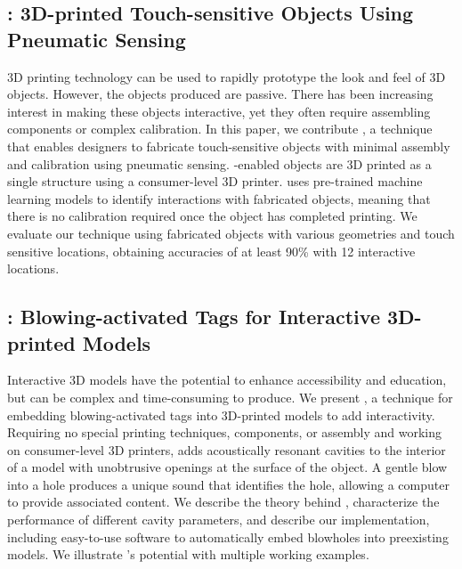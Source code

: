     \subsection*{\at: 3D-printed Touch-sensitive Objects Using Pneumatic
      Sensing}
      3D printing technology can be used to rapidly prototype the look and
      feel of 3D objects. However, the objects produced are passive. There
      has been increasing interest in making these objects interactive, yet
      they often require assembling components or complex calibration. In
      this paper, we contribute \at, a technique that enables designers
      to fabricate touch-sensitive objects with minimal assembly and
      calibration using pneumatic sensing. \at-enabled objects are 3D
      printed as a single structure using a consumer-level 3D printer.
      \at uses pre-trained machine learning models to identify
      interactions with fabricated objects, meaning that there is no
      calibration required once the object has completed printing. We
      evaluate our technique using fabricated objects with various geometries
      and touch sensitive locations, obtaining accuracies of at least 90\%
      with 12 interactive locations.

    \subsection*{\bh: Blowing-activated Tags for Interactive 3D-printed
      Models}
      Interactive 3D models have the potential to enhance accessibility and
      education, but can be complex and time-consuming to produce. We present
      \bh, a technique for embedding blowing-activated tags into
      3D-printed models to add interactivity. Requiring no special printing
      techniques, components, or assembly and working on consumer-level 3D
      printers, \bh adds acoustically resonant cavities to the interior
      of a model with unobtrusive openings at the surface of the object. A
      gentle blow into a hole produces a unique sound that identifies the
      hole, allowing a computer to provide associated content. We describe
      the theory behind \bh, characterize the performance of different
      cavity parameters, and describe our implementation, including
      easy-to-use software to automatically embed blowholes into preexisting
      models. We illustrate \bh's potential with multiple working
      examples.

